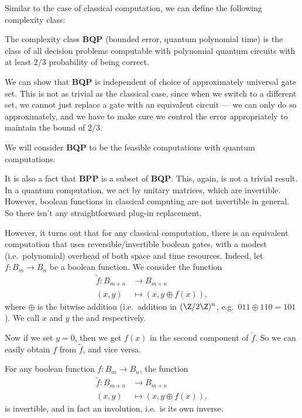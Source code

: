 \documentclass[a4paper]{article}
\begin{document}
Similar to the case of classical computation, we can define the following complexity class:
\begin{defi}
  The complexity class \textbf{BQP} (bounded error, quantum polynomial time) is the class of all decision problems computable with polynomial quantum circuits with at least $2/3$ probability of being correct.
\end{defi}
We can show that \textbf{BQP} is independent of choice of approximately universal gate set. This is not as trivial as the classical case, since when we switch to a different set, we cannot just replace a gate with an equivalent circuit --- we can only do so approximately, and we have to make sure we control the error appropriately to maintain the bound of $2/3$.

We will consider \textbf{BQP} to be the feasible computations with quantum computations.

It is also a fact that \textbf{BPP} is a subset of \textbf{BQP}. This, again, is not a trivial result. In a quantum computation, we act by unitary matrices, which are invertible. However, boolean functions in classical computing are not invertible in general. So there isn't any straightforward plug-in replacement.

However, it turns out that for any classical computation, there is an equivalent computation that uses reversible/invertible boolean gates, with a modest (i.e.\ polynomial) overhead of both space and time resources. Indeed, let $f: B_m \to B_n$ be a boolean function. We consider the function
\begin{align*}
  \tilde{f}: B_{m + n} &\to B_{m + n}\\
  (x, y) &\mapsto (x, y \oplus f(x)),
\end{align*}
where $\oplus$ is the bitwise addition (i.e.\ addition in $(\Z/2\Z)^n$, e.g.\ $011 \oplus 110 = 101$). We call $x$ and $y$ the  and  respectively.

Now if we set $y = 0$, then we get $f(x)$ in the second component of $\tilde{f}$. So we can easily obtain $f$ from $\tilde{f}$, and vice versa.

\begin{lemma}
  For any boolean function $f: B_m \to B_n$, the function
  \begin{align*}
    \tilde{f}: B_{m + n} &\to B_{m + n}\\
    (x, y) &\mapsto (x, y \oplus f(x)),
  \end{align*}
  is invertible, and in fact an involution, i.e.\ is its own inverse.
\end{lemma}
\end{document}
